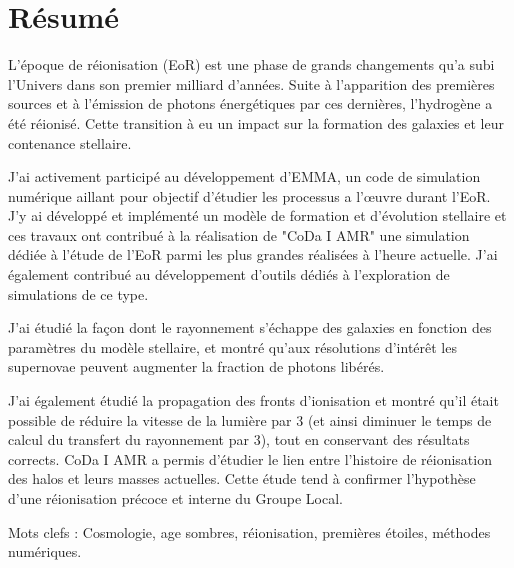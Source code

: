 \begingroup
\let\clearpage\relax
\let\cleardoublepage\relax
\let\cleardoublepage\relax

\chapter*{Résumé}
L’époque de réionisation (EoR) est une phase de grands changements qu’a subi l’Univers dans son premier milliard d’années. 
Suite à l’apparition des premières sources et à l’émission de photons énergétiques par ces dernières, l’hydrogène a été réionisé. 
Cette transition à eu un impact sur la formation des galaxies et leur contenance stellaire.

J’ai activement participé au développement d’EMMA, un code de simulation numérique aillant pour objectif d’étudier les processus a l’œuvre durant l’EoR. 
J’y ai développé et implémenté un modèle de formation et d’évolution stellaire et ces travaux ont contribué à la réalisation de "CoDa I AMR" une simulation dédiée à l’étude de l’EoR parmi les plus grandes réalisées à l’heure actuelle. 
J’ai également contribué au développement d’outils dédiés à l’exploration de simulations de ce type.

J’ai étudié la façon dont le rayonnement s’échappe des galaxies en fonction des paramètres du modèle stellaire, et montré qu'aux résolutions d’intérêt les supernovae peuvent augmenter la fraction de photons libérés.

J’ai également étudié la propagation des fronts d’ionisation et montré qu’il était possible de réduire la vitesse de la lumière par 3 (et ainsi diminuer le temps de calcul du transfert du rayonnement par 3), tout en conservant des résultats corrects.
CoDa I AMR a permis d'étudier le lien entre l'histoire de réionisation des halos et leurs masses actuelles.
Cette étude tend à confirmer l'hypothèse d'une réionisation précoce et interne du Groupe Local.


\vspace{0.5cm}

Mots clefs : Cosmologie, age sombres, réionisation, premières étoiles, méthodes numériques.
\vfill

\newpage

